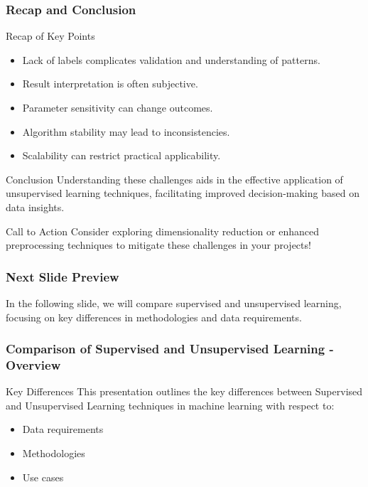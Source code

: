 \documentclass[aspectratio=169]{beamer}
\begin{document}
\begin{frame}[fragile]
    \frametitle{Recap and Conclusion}
    \begin{block}{Recap of Key Points}
        \begin{itemize}
            \item Lack of labels complicates validation and understanding of patterns.
            \item Result interpretation is often subjective.
            \item Parameter sensitivity can change outcomes.
            \item Algorithm stability may lead to inconsistencies.
            \item Scalability can restrict practical applicability.
        \end{itemize}
    \end{block}

    \begin{block}{Conclusion}
        Understanding these challenges aids in the effective application of unsupervised learning techniques, facilitating improved decision-making based on data insights.
    \end{block}

    \begin{block}{Call to Action}
        Consider exploring dimensionality reduction or enhanced preprocessing techniques to mitigate these challenges in your projects!
    \end{block}
\end{frame}

\begin{frame}[fragile]
    \frametitle{Next Slide Preview}
    In the following slide, we will compare supervised and unsupervised learning, focusing on key differences in methodologies and data requirements.
\end{frame}

\begin{frame}[fragile]
    \frametitle{Comparison of Supervised and Unsupervised Learning - Overview}
    \begin{block}{Key Differences}
        This presentation outlines the key differences between Supervised and Unsupervised Learning techniques in machine learning with respect to:
        \begin{itemize}
            \item Data requirements
            \item Methodologies
            \item Use cases
        \end{itemize}
    \end{block}
\end{frame}
\end{document}
